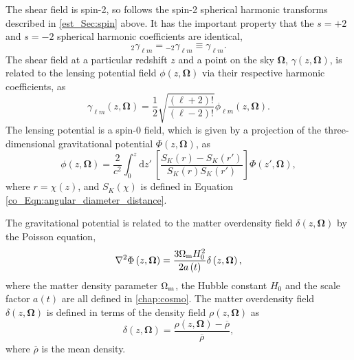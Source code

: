 The shear field is spin-2, so follows the spin-2 spherical harmonic transforms described in \autoref{est_Sec:spin} above. It has the important property that the $s = +2$ and $s = -2$ spherical harmonic coefficients are identical,
\begin{equation}
{}_{2}\gamma_{\ell m} = {}_{-2}\gamma_{\ell m}
\equiv \gamma_{\ell m}.
\label{est_Eqn:shear_alm_equal}
\end{equation}
The shear field at a particular redshift $z$ and a point on the sky $\bm{\Omega}$, $\gamma \left( z, \bm{\Omega} \right)$, is related to the lensing potential field $\phi \left( z, \bm{\Omega} \right)$ via their respective harmonic coefficients, as
\begin{equation}
\gamma_{\ell m} \left( z, \bm{\Omega} \right)
= \frac{1}{2} \sqrt{\frac{\left( \ell + 2 \right)!}
{\left( \ell - 2 \right)!}}
\phi_{\ell m} \left( z, \bm{\Omega} \right).
\end{equation}
The lensing potential is a spin-0 field, which is given by a projection of the three-\linebreak dimensional gravitational potential $\Phi \left( z, \bm{\Omega} \right)$, as
\begin{equation}
\phi \left( z, \bm{\Omega} \right) = \frac{2}{c^2}
\int_0^z \text{d}z'~
\left[ \frac{S_K \left( r \right) - S_K \left( r' \right)}
{S_K \left( r \right) S_K \left( r' \right)} \right]
\Phi \left( z', \bm{\Omega} \right),
\label{est_Eqn:lensing_potential}
\end{equation}
where $r = \chi \left( z \right)$, and $S_K \left( \chi \right)$ is defined in Equation \eqref{co_Eqn:angular_diameter_distance}.

The gravitational potential is related to the matter overdensity field $\delta \left( z, \bm{\Omega} \right)$ by the Poisson equation,
\begin{equation}
\nabla^2 \Phi \left( z, \bm{\Omega} \right)
= \frac{3 \Omega_\text{m} H_0^2}{2 a \left( t \right)}
\delta \left( z, \bm{\Omega} \right),
\end{equation}
where the matter density parameter $\Omega_\text{m}$, the Hubble constant $H_0$ and the scale factor $a \left( t \right)$ are all defined in \autoref{chap:cosmo}. The matter overdensity field $\delta \left( z, \bm{\Omega} \right)$ is defined in terms of the density field $\rho \left( z, \bm{\Omega} \right)$ as
\begin{equation}
\delta \left( z, \bm{\Omega} \right) =
\frac{\rho \left( z, \bm{\Omega} \right) - \overline{\rho}}{\overline{\rho}},
\label{est_Eqn:matter_overdensity}
\end{equation}
where $\overline{\rho}$ is the mean density.

